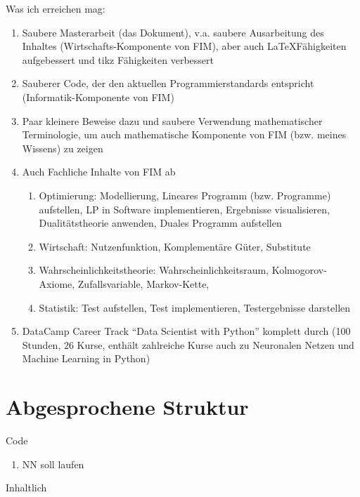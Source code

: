Was ich erreichen mag:
\begin{enumerate}[noitemsep]
	\item Saubere Masterarbeit (das Dokument), v.a. saubere Ausarbeitung des Inhaltes (Wirtschafts-Komponente von FIM), aber auch \LaTeX Fähigkeiten aufgebessert und tikz Fähigkeiten verbessert
	\item Sauberer Code, der den aktuellen Programmierstandards entspricht (Informatik-Komponente von FIM)
	\item Paar kleinere Beweise dazu und saubere Verwendung mathematischer Terminologie, um auch mathematische Komponente von FIM (bzw. meines Wissens) zu zeigen
	\item Auch Fachliche Inhalte von FIM ab
	\begin{enumerate}[noitemsep]
		\item Optimierung: Modellierung, Lineares Programm (bzw. Programme) aufstellen, LP in Software implementieren, Ergebnisse visualisieren, Dualitätstheorie anwenden, Duales Programm aufstellen
		\item Wirtschaft: Nutzenfunktion, Komplementäre Güter, Substitute
		\item Wahrscheinlichkeitstheorie: Wahrscheinlichkeitsraum, Kolmogorov-Axiome, Zufallsvariable, Markov-Kette, 
		\item Statistik: Test aufstellen, Test implementieren, Testergebnisse darstellen
	\end{enumerate}
	\item DataCamp Career Track \enquote{Data Scientist with Python} komplett durch (100 Stunden, 26 Kurse, enthält zahlreiche Kurse auch zu Neuronalen Netzen und Machine Learning in Python)
\end{enumerate}

\newpage

\section{Abgesprochene Struktur}

Code
\begin{enumerate}
	\item NN soll laufen
\end{enumerate}

Inhaltlich


